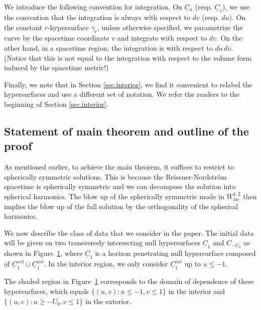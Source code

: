 \documentclass[12 pt, reqno]{amsart}
\theoremstyle{definition}
\theoremstyle{remark}
\numberwithin{equation}{section}
\newcommand{\set}[1]{\{#1\}}
\newcommand{\0}{\emptyset}
\newcommand{\uC}{\underline{C}}
\begin{document}
We introduce the following convention for integration. On $C_u$ (resp. $\underline C_v$), we use the convention that the integration is always with respect to $dv$ (resp. $du$).
On the constant $r$-hypersurface $\gamma_r$, unless otherwise specified, we parametrize the curve by the spacetime coordinate $v$ and integrate with respect to $dv$. 
On the other hand, in a spacetime region, the integration is with respect to $du\, dv$. (Notice that this is not equal to the integration with respect to the volume form induced by the spacetime metric!)

Finally, we note that in Section \ref{sec.interior}, we find it convenient to relabel the hypersurfaces and use a different set of notation. We refer the readers to the beginning of Section \ref{sec.interior}.

\subsection{Statement of main theorem and outline of the proof}\label{sec.main.thm}
As mentioned earlier, to achieve the main theorem, it suffices to restrict to spherically symmetric solutions. This is because the Reissner-Nordstr\"om spacetime is spherically symmetric and we can decompose the solution into spherical harmonics. The blow up of the spherically symmetric mode in $W^{1,2}_{loc}$ then implies the blow up of the full solution by the orthogonality of the spherical harmonics. 


We now describe the class of data that we consider in the paper. The initial data will be given on two transversely intersecting null hypersurfaces $\underline C_1$ and $C_{-U_0}$ as shown in Figure~\ref{fig:data}, where $\underline C_1$ is a horizon penetrating null hypersurface composed of $\uC_{1}^{ext} \cup \uC_{1}^{int}$. In the interior region, we only consider $\uC_{1}^{int}$ up to $u \leq -1$.
\begin{figure}[h]
\begin{center}
\def\svgwidth{200px}
 
\caption{} \label{fig:data}
\end{center}
\end{figure}

The shaded region in Figure~\ref{fig:data} corresponds to the domain of dependence of these hypersurfaces, which equals $\set{(u, v) : u \leq -1, v \leq 1}$ in the interior and $\set{(u, v) : u \geq -U_{0}, v \leq 1}$ in the exterior.
\end{document}
